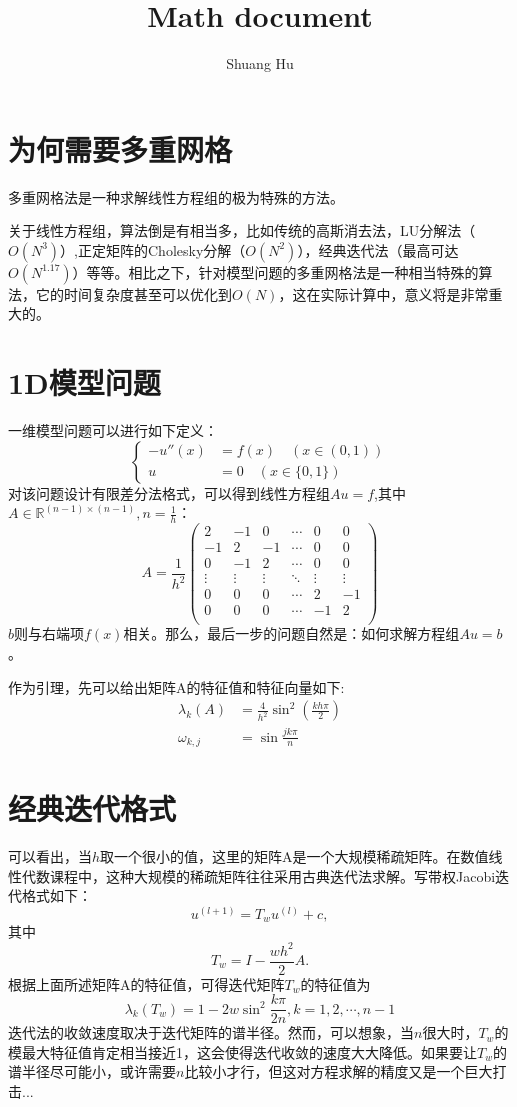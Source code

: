 \documentclass[UTF8]{ctexart}
\title{Math document}
\author{Shuang Hu}
\theoremstyle{plain}
\theoremstyle{definition}
\theoremstyle{remark}
\begin{document}
\maketitle
\section{为何需要多重网格}
多重网格法是一种求解线性方程组的极为特殊的方法。

关于线性方程组，算法倒是有相当多，比如传统的高斯消去法，LU分解法（$O(N^3)$）,正定矩阵的Cholesky分解（$O(N^2)$），经典迭代法（最高可达$O(N^{1.17})$）等等。相比之下，针对模型问题的多重网格法是一种相当特殊的算法，它的时间复杂度甚至可以优化到$O(N)$，这在实际计算中，意义将是非常重大的。
\section{1D模型问题}
一维模型问题可以进行如下定义：
$$
\left\{
\begin{aligned}
-u''(x)&=f(x) \quad(x\in(0,1))\\
u&=0\quad(x\in\{0,1\})
\end{aligned}
\right.
$$
对该问题设计有限差分法格式，可以得到线性方程组$Au=f$,其中$A\in\mathbb{R}^{(n-1)\times(n-1)},n=\frac{1}{h}$：
$$
A=\frac{1}{h^2}\begin{pmatrix}
2&-1&0&\cdots&0&0\\
-1&2&-1&\cdots&0&0\\
0&-1&2&\cdots&0&0\\
\vdots&\vdots&\vdots&\ddots&\vdots&\vdots\\
0&0&0&\cdots&2&-1\\
0&0&0&\cdots&-1&2\\
\end{pmatrix}
$$
$b$则与右端项$f(x)$相关。那么，最后一步的问题自然是：如何求解方程组$Au=b$。

作为引理，先可以给出矩阵A的特征值和特征向量如下:
$$
\begin{aligned}
\lambda_{k}(A)&=\frac{4}{h^{2}}\sin^{2}(\frac{kh\pi}{2})\\
\omega_{k,j}&=\sin\frac{jk\pi}{n}
\end{aligned}
$$
\section{经典迭代格式}
可以看出，当$h$取一个很小的值，这里的矩阵A是一个大规模稀疏矩阵。在数值线性代数课程中，这种大规模的稀疏矩阵往往采用古典迭代法求解。写带权Jacobi迭代格式如下：
$$
u^{(l+1)}=T_{w}u^{(l)}+c,
$$
其中
$$
T_{w}=I-\frac{wh^{2}}{2}A.
$$
根据上面所述矩阵A的特征值，可得迭代矩阵$T_{w}$的特征值为
$$
\lambda_{k}(T_{w})=1-2w\sin^{2}\frac{k\pi}{2n},k=1,2,\cdots,n-1
$$
迭代法的收敛速度取决于迭代矩阵的谱半径。然而，可以想象，当$n$很大时，$T_{w}$的模最大特征值肯定相当接近1，这会使得迭代收敛的速度大大降低。如果要让$T_{w}$的谱半径尽可能小，或许需要$n$比较小才行，但这对方程求解的精度又是一个巨大打击...
\end{document}
